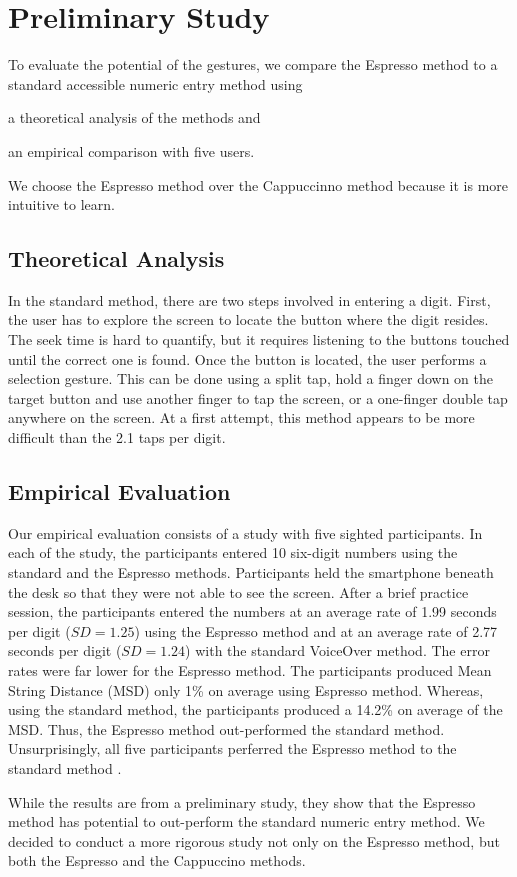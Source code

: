 \section{Preliminary Study}
\label{sec:tapulator}

To evaluate the potential of the gestures, we compare the Espresso method to a standard accessible numeric entry method using 
  \begin{enumerate*}[(1) ]
    \item a theoretical analysis of the methods and 
    \item an empirical comparison with five users. 
  \end{enumerate*}
We choose the Espresso method over the Cappuccinno method because it is more intuitive to learn.

\subsection{Theoretical Analysis}
In the standard method, there are two steps involved in entering a digit. First, the user has to explore the screen to locate the button where the digit resides. The seek time is hard to quantify, but it requires listening to the buttons touched until the correct one is found. Once the button is located, the user performs a selection gesture. This can be done using a split tap, hold a finger down on the target button and use another finger to tap the screen, or a one-finger double tap anywhere on the screen. At a first attempt, this method appears to be more difficult than the 2.1 taps per digit.

\subsection{Empirical Evaluation}
Our empirical evaluation consists of a study with five sighted participants. In each of the study, the participants entered 10 six-digit numbers using the standard and the Espresso methods. Participants held the smartphone beneath the desk so that they were not able to see the screen. After a brief practice session, the participants entered the numbers at an average rate of 1.99 seconds per digit ($SD = 1.25$) using the Espresso method and at an average rate of 2.77 seconds per digit ($SD = 1.24$) with the standard VoiceOver method. The error rates were far lower for the Espresso method. The participants produced Mean String Distance (MSD) only 1\% on average using Espresso method. Whereas, using the standard method, the participants produced a 14.2\% on average of the MSD. Thus, the Espresso method out-performed the standard method. Unsurprisingly, all five participants perferred the Espresso method to the standard method \cite{Ruamviboonsuk:2012}.
\par
While the results are from a preliminary study, they show that the Espresso method has potential to out-perform the standard numeric entry method. We decided to conduct a more rigorous study not only on the Espresso method, but both the Espresso and the Cappuccino methods.